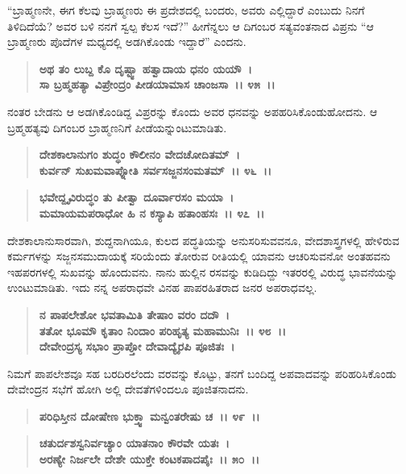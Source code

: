 “ಬ್ರಾಹ್ಮಣನೇ, ಈಗ ಕೆಲವು ಬ್ರಾಹ್ಮಣರು ಈ ಪ್ರದೇಶದಲ್ಲಿ ಬಂದರು, ಅವರು ಎಲ್ಲಿದ್ದಾರೆ ಎಂಬುದು ನಿನಗೆ ತಿಳಿದಿದೆಯೆ? ಅವರ ಬಳಿ ನನಗೆ ಸ್ವಲ್ಪ ಕೆಲಸ ಇದೆ?” ಹೀಗೆನ್ನಲು ಆ ದಿಗಂಬರ ಸತ್ಯವಂತನಾದ ವಿಪ್ರನು ``ಆ ಬ್ರಾಹ್ಮಣರು ಪೊದೆಗಳ ಮಧ್ಯದಲ್ಲಿ ಅಡಗಿಕೊಂಡು ಇದ್ದಾರೆ” ಎಂದನು.

\begin{verse}
\textbf{ಅಥ ತಂ ಲುಬ್ದ ಕೊ ದೃಷ್ಟ್ವಾ ಹತ್ವಾದಾಯ ಧನಂ ಯಯೌ~।}\\\textbf{ಸಾ ಬ್ರಹ್ಮಹತ್ಯಾ ವಿಪ್ರೇಂದ್ರಂ ಪೀಡಯಾಮಾಸ ಚಾಂಜಸಾ~।। ೪೫~।।}
\end{verse}

ನಂತರ ಬೇಡನು ಆ ಅಡಗಿಕೊಂಡಿದ್ದ ವಿಪ್ರರನ್ನು ಕೊಂದು ಅವರ ಧನವನ್ನು ಅಪಹರಿಸಿಕೊಂಡುಹೋದನು. ಆ ಬ್ರಹ್ಮಹತ್ಯವು ದಿಗಂಬರ ಬ್ರಾಹ್ಮಣನಿಗೆ ಪೀಡೆಯನ್ನುಂಟುಮಾಡಿತು.

\begin{verse}
\textbf{ದೇಶಕಾಲಾನುಗಂ ಶುದ್ಧಂ ಕೌಲೀನಂ ವೇದಚೋದಿತಮ್~।}\\\textbf{ಕುರ್ವನ್ ಸುಖಮವಾಪ್ನೋತಿ ಸರ್ವಸಜ್ಜನಸಂಮತಮ್~।। ೪೬~।। }
\end{verse}

\begin{verse}
\textbf{ಭವೇದ್ದೃವಿರುದ್ಧಂ ತು ಪೀತ್ವಾ ದೂರ್ವಾರಸಂ ಮಯಾ~।}\\\textbf{ಮಮಾಯಮಪರಾಧೋ ಹಿ ನ ಕಸ್ಯಾಪಿ ಹತಾಂಹಸಃ~।। ೪೭~।।}
\end{verse}

ದೇಶಕಾಲಾನುಸಾರವಾಗಿ, ಶುದ್ದನಾಗಿಯೂ, ಕುಲದ ಪದ್ಧತಿಯನ್ನು ಅನುಸರಿಸುವವನೂ, ವೇದಶಾಸ್ತ್ರಗಳಲ್ಲಿ ಹೇಳಿರುವ ಕರ್ಮಗಳನ್ನು ಸಜ್ಜನಸಮುದಾಯಕ್ಕೆ ಸರಿಯೆಂದು ತೋರುವ ರೀತಿಯಲ್ಲಿ ಯಾವನು ಆಚರಿಸುವನೋ ಅಂತಹವನು ಇಹಪರಗಳಲ್ಲಿ ಸುಖವನ್ನು ಹೊಂದುವನು. ನಾನು ಹುಲ್ಲಿನ ರಸವನ್ನು ಕುಡಿದಿದ್ದು ಇತರರಲ್ಲಿ ವಿರುದ್ಧ ಭಾವನೆಯನ್ನು ಉಂಟುಮಾಡಿತು. ಇದು ನನ್ನ ಅಪರಾಧವೇ ವಿನಹ ಪಾಪರಹಿತರಾದ ಜನರ ಅಪರಾಧವಲ್ಲ.

\begin{verse}
\textbf{ನ ಪಾಪಲೇಶೋ ಭವತಾಮಿತಿ ತೇಷಾಂ ವರಂ ದದೌ~।}\\\textbf{ತತೋ ಭೂಮೌ ಕೃತಾಂ ನಿಂದಾಂ ಪರಿಹೃತ್ಯ ಮಹಾಮುನಿಃ~।। ೪೮~।।}\\\textbf{ದೇವೇಂದ್ರಸ್ಯ ಸಭಾಂ ಪ್ರಾಪ್ತೋ ದೇವಾದ್ಯೈರಪಿ ಪೂಜಿತಃ~।}
\end{verse}

ನಿಮಗೆ ಪಾಪಲೇಶವೂ ಸಹ ಬರದಿರಲೆಂದು ವರವನ್ನು ಕೊಟ್ಟು, ತನಗೆ ಬಂದಿದ್ದ ಅಪವಾದವನ್ನು ಪರಿಹರಿಸಿಕೊಂಡು ದೇವೇಂದ್ರನ ಸಭೆಗೆ ಹೋಗಿ ಅಲ್ಲಿ ದೇವತೆಗಳಿಂದಲೂ ಪೂಜಿತನಾದನು.

\begin{verse}
\textbf{ಪರಿಧಿಸ್ತೀನ ದೋಷೇಣ ಭುಕ್ತ್ವಾ ಮನ್ವಂತರೇಷು ಚ~।। ೪೯~।।}
\end{verse}

\begin{verse}
\textbf{ಚತುರ್ದಶಸ್ವನಿರ್ವಚ್ಯಾಂ ಯಾತನಾಂ ಕೌರವೇ ಯತಃ~।}\\\textbf{ಅರಣ್ಯೇ ನಿರ್ಜಲೇ ದೇಶೇ ಯುಕ್ತೇ ಕಂಟಕಪಾದಪೈಃ~।। ೫೦~।।}
\end{verse}

